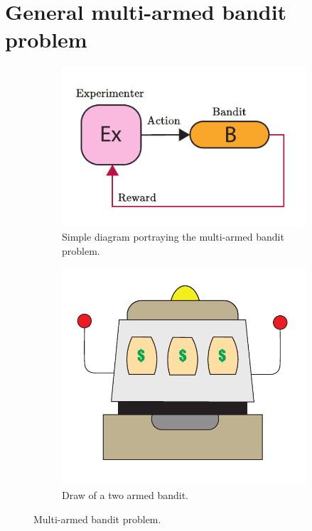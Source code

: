 \documentclass[11pt,a4paper,twoside]{report}
\newcommand{\+}{\textnormal{+} }
\theoremstyle{definition}
\numberwithin{equation}{chapter}
\begin{document}
\section{General multi-armed bandit problem}
\begin{figure}[t]
  \centering
  \begin{subfigure}{.4\textwidth}
    \centering
    \includegraphics[width=1\linewidth]{figures/Bandit.pdf}
    \caption{Simple diagram portraying the multi-armed bandit problem.}
  \end{subfigure}
  \begin{subfigure}{.4\textwidth}
    \centering
    \includegraphics[width=1\linewidth]{figures/Bandit-Draw.pdf}
    \caption{Draw of a two armed bandit.}
  \end{subfigure}
  \caption{Multi-armed bandit problem.}
  \end{figure}
\end{document}
